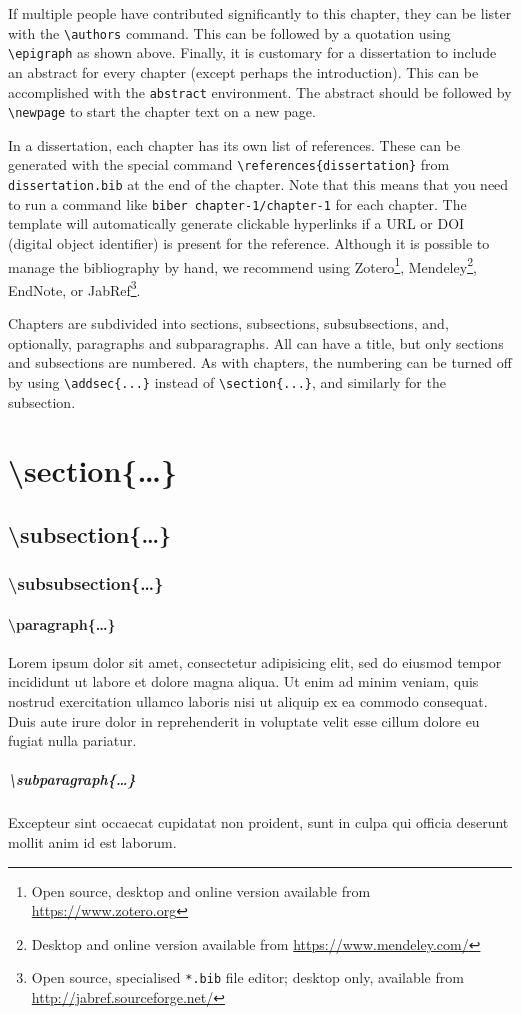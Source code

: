 \begin{refsection}
If multiple people have contributed significantly to this chapter, they can be lister with the \verb|\authors| command. This can be followed by a quotation using \verb|\epigraph| as shown above. Finally, it is customary for a dissertation to include an abstract for every chapter (except perhaps the introduction). This can be accomplished with the \texttt{abstract} environment. The abstract should be followed by \verb|\newpage| to start the chapter text on a new page.

In a dissertation, each chapter has its own list of references. These can be generated with the special command \verb|\references|\allowbreak\verb|{dissertation}| from \texttt{disser\-tation.bib} at the end of the chapter. Note that this means that you need to run a command like \texttt{biber chapter-1/\allowbreak chapter-1} for each chapter. The template will automatically generate clickable hyperlinks if a URL or DOI (digital object identifier) is present for the reference. Although it is possible to manage the bibliography by hand, we  recommend using Zotero\footnote{Open source, desktop and online version available from \url{https://www.zotero.org}}, Mendeley\footnote{Desktop and online version available from \url{https://www.mendeley.com/}}, EndNote, or JabRef\footnote{Open source, specialised \texttt{*.bib} file editor; desktop only, available from \url{http://jabref.sourceforge.net/}}.

Chapters are subdivided into sections, subsections, subsubsections, and, optionally, paragraphs and subparagraphs. All can have a title, but only sections and subsections are numbered. As with chapters, the numbering can be turned off by using \verb|\addsec{...}| instead of \verb|\section{...}|, and similarly for the subsection.
\section{\textbackslash section\{\ldots\}}
\subsection{\textbackslash subsection\{\ldots\}}
\subsubsection{\textbackslash subsubsection\{\ldots\}}
\paragraph{\textbackslash paragraph\{\ldots\}}
Lorem ipsum dolor sit amet, consectetur adipisicing elit, sed do eiusmod tempor incididunt ut labore et dolore magna aliqua. Ut enim ad minim veniam, quis nostrud exercitation ullamco laboris nisi ut aliquip ex ea commodo consequat. Duis aute irure dolor in reprehenderit in voluptate velit esse cillum dolore eu fugiat nulla pariatur.
\subparagraph{\textbackslash subparagraph\{\ldots\}}
Excepteur sint occaecat cupidatat non proident, sunt in culpa qui officia deserunt mollit anim id est laborum.


\end{refsection}
